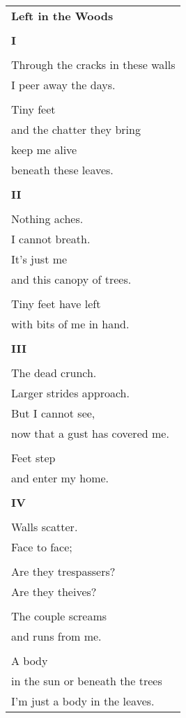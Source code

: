 \documentclass{article}
\begin{document}
\begin{center}
\begin{tabular}{l}
\textbf{Left in the Woods} \\
\\
\textbf{I} \\
\\
Through the cracks in these walls \\
I peer away the days. \\
\\
Tiny feet \\
and the chatter they bring \\
keep me alive \\
beneath these leaves. \\
\\
\textbf{II} \\
\\
Nothing aches. \\
I cannot breath. \\
It's just me \\
and this canopy of trees. \\
\\
Tiny feet have left \\
with bits of me in hand. \\
\\
\textbf{III} \\
\\
The dead crunch. \\ %
Larger strides approach. \\
But I cannot see, \\
now that a gust has covered me. \\
\\
Feet step \\
and enter my home. \\
\\
\textbf{IV} \\
\\
Walls scatter. \\
Face to face; \\
\\
Are they trespassers? \\
Are they theives? \\
\\
The couple screams \\
and runs from me. \\
\\
A body \\
in the sun or beneath the trees \\
I'm just a body in the leaves. \\
\end{tabular}
\end{center}
\end{document}
